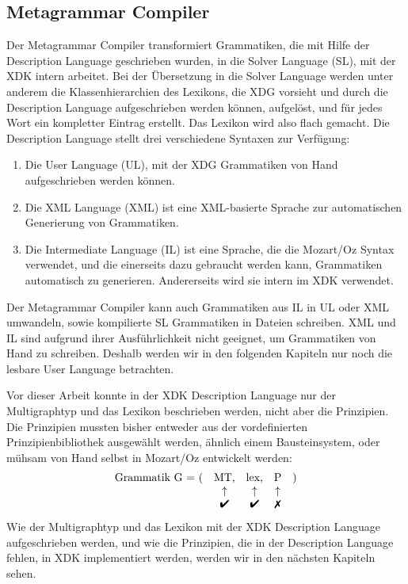 \subsection{Metagrammar Compiler}

Der Metagrammar Compiler transformiert Grammatiken, die mit Hilfe der
Description Language geschrieben wurden, in die Solver Language (SL),
mit der XDK intern arbeitet.  Bei der \"Ubersetzung in die Solver
Language werden unter anderem die Klassenhierarchien des Lexikons, die
XDG vorsieht und durch die Description Language aufgeschrieben werden
k\"onnen, aufgel\"ost, und f\"ur jedes Wort ein kompletter Eintrag
erstellt. Das Lexikon wird also flach gemacht. Die Description
Language stellt drei verschiedene Syntaxen zur Verf\"ugung:
\begin{enumerate}
\item Die User Language (UL), mit der XDG Grammatiken von Hand
  aufgeschrieben werden k\"onnen.
\item Die XML Language (XML) ist eine XML-basierte Sprache zur
  automatischen Generierung von Grammatiken.
\item Die Intermediate Language (IL) ist eine Sprache, die die
  Mozart/Oz Syntax verwendet, und die einerseits dazu gebraucht werden
  kann, Grammatiken automatisch zu generieren. Andererseits wird sie
  intern im XDK verwendet.
\end{enumerate}
Der Metagrammar Compiler kann auch Grammatiken aus IL in UL oder XML
umwandeln, sowie kompilierte SL Grammatiken in Dateien schreiben.  XML
und IL sind aufgrund ihrer Ausf\"uhrlichkeit nicht geeignet, um
Grammatiken von Hand zu schreiben.  Deshalb werden wir in den
folgenden Kapiteln nur noch die lesbare User Language betrachten.

Vor dieser Arbeit konnte in der XDK Description Language nur der
Multigraphtyp und das Lexikon beschrieben werden, nicht aber die
Prinzipien.  Die Prinzipien mussten bisher entweder aus der
vordefinierten Prinzipienbibliothek ausgew\"ahlt werden, \"ahnlich
einem Bausteinsystem, oder m\"uhsam von Hand selbst in Mozart/Oz
entwickelt werden:
$$
\begin{array}{r c c c l}
\text{Grammatik G = (} & \text{MT,} & \text{lex,} & \text{P} & \text{)} \\
 & \uparrow & \uparrow & \uparrow & \\
 & \text{\ding{52}} & \text{\ding{52}} & \text{\ding{55}} &
\end{array}
$$ Wie der Multigraphtyp und das Lexikon mit der XDK Description
Language aufgeschrieben werden, und wie die Prinzipien, die in der
Description Language fehlen, in XDK implementiert werden, werden wir
in den n\"achsten Kapiteln sehen.

